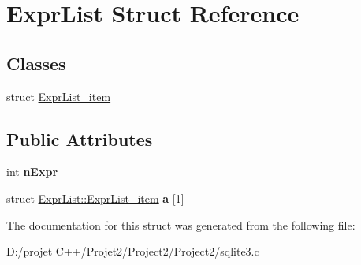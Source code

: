\hypertarget{struct_expr_list}{}\section{Expr\+List Struct Reference}
\label{struct_expr_list}
\subsection*{Classes}
\begin{DoxyCompactItemize}
\item 
struct \mbox{\hyperlink{struct_expr_list_1_1_expr_list__item}{Expr\+List\+\_\+item}}
\end{DoxyCompactItemize}
\subsection*{Public Attributes}
\begin{DoxyCompactItemize}
\item 
\mbox{\label{struct_expr_list_a88bdbd62cce306124eea63ae9f80ec33}} 
int {\bfseries n\+Expr}
\item 
\mbox{\label{struct_expr_list_acd86bd68fd8f9508bcce9e733a7d523c}} 
struct \mbox{\hyperlink{struct_expr_list_1_1_expr_list__item}{Expr\+List\+::\+Expr\+List\+\_\+item}} {\bfseries a} \mbox{[}1\mbox{]}
\end{DoxyCompactItemize}


The documentation for this struct was generated from the following file\+:\begin{DoxyCompactItemize}
\item 
D\+:/projet C++/\+Projet2/\+Project2/\+Project2/sqlite3.\+c\end{DoxyCompactItemize}

